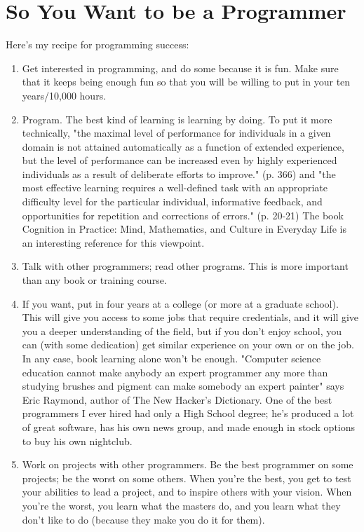 \documentclass[12pt,a4paper,final,twoside,onecolumn,titlepage]{book}
\begin{document}
\section{So You Want to be a Programmer}

Here's my recipe for programming success:
\begin{enumerate}
\item Get interested in programming, and do some because it is fun. Make sure that it keeps being enough fun so that you will be willing to put in your ten years/10,000 hours.
\item Program. The best kind of learning is learning by doing. To put it more technically, "the maximal level of performance for individuals in a given domain is not attained automatically as a function of extended experience, but the level of performance can be increased even by highly experienced individuals as a result of deliberate efforts to improve." (p. 366) and "the most effective learning requires a well-defined task with an appropriate difficulty level for the particular individual, informative feedback, and opportunities for repetition and corrections of errors." (p. 20-21) The book Cognition in Practice: Mind, Mathematics, and Culture in Everyday Life is an interesting reference for this viewpoint.
\item Talk with other programmers; read other programs. This is more important than any book or training course.
\item If you want, put in four years at a college (or more at a graduate school). This will give you access to some jobs that require credentials, and it will give you a deeper understanding of the field, but if you don't enjoy school, you can (with some dedication) get similar experience on your own or on the job. In any case, book learning alone won't be enough. "Computer science education cannot make anybody an expert programmer any more than studying brushes and pigment can make somebody an expert painter" says Eric Raymond, author of The New Hacker's Dictionary. One of the best programmers I ever hired had only a High School degree; he's produced a lot of great software, has his own news group, and made enough in stock options to buy his own nightclub.
\item Work on projects with other programmers. Be the best programmer on some projects; be the worst on some others. When you're the best, you get to test your abilities to lead a project, and to inspire others with your vision. When you're the worst, you learn what the masters do, and you learn what they don't like to do (because they make you do it for them).

\end{enumerate}
\end{document}

